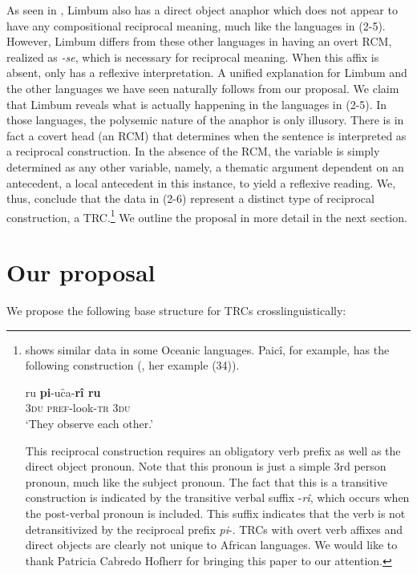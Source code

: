 \documentclass[output=paper]{langsci/langscibook}
\begin{document}
As seen in , Limbum also has a direct object anaphor which does not appear to have any compositional reciprocal meaning, much like the languages in (2-5). However, Limbum differs from these other languages in having an overt RCM, realized as \textit{-se}, which is necessary for reciprocal meaning. When this affix is absent,  only has a reflexive interpretation. A unified explanation for Limbum and the other languages we have seen naturally follows from our proposal. We claim that Limbum reveals what is actually happening in the languages in (2-5). In those languages, the polysemic nature of the anaphor is only illusory. There is in fact a covert head (an RCM) that determines when the sentence is interpreted as a reciprocal construction. In the absence of the RCM, the variable is simply determined as any other variable, namely, a thematic argument dependent on an antecedent, a local antecedent in this instance, to yield a reflexive reading. We, thus, conclude that the data in (2-6) represent a distinct type of reciprocal construction, a TRC.\footnote{\citet{MoyseFaurie2008} shows similar data in some Oceanic languages. Paicî, for example, has the following construction (\citealt[121]{MoyseFaurie2008}, her example (34)).

\ea
\gll  ru  \textbf{pi}-uc̑a-\textbf{rî  ru}\\
 \textsc{3du}  \textsc{pref}-look-\textsc{tr}  \textsc{3du}\\
\glt  ‘They observe each other.’
\z

This reciprocal construction requires an obligatory verb prefix as well as the direct object pronoun. Note that this pronoun is just a simple 3rd person pronoun, much like the subject pronoun. The fact that this is a transitive construction is indicated by the transitive verbal suffix -\textit{rî}, which occurs when the post-verbal pronoun is included. This suffix indicates that the verb is not detransitivized by the reciprocal prefix \textit{pi}-. TRCs with overt verb affixes and direct objects are clearly not unique to African languages. We would like to thank Patricia Cabredo Hofherr for bringing this paper to our attention.} We outline the proposal in more detail in the next section.

\section{Our proposal} 

We propose the following base structure for TRCs crosslinguistically:
\end{document}
